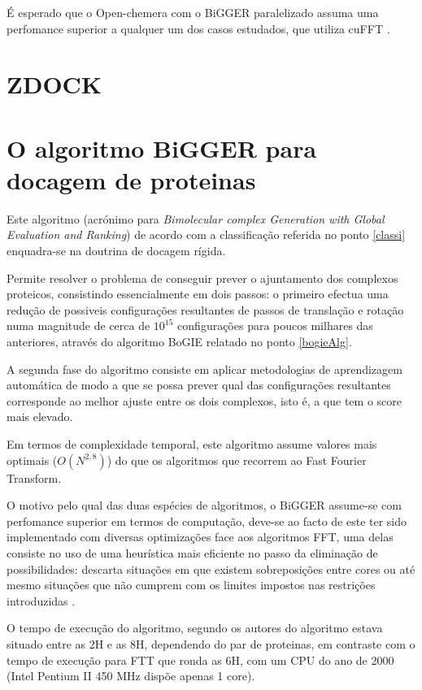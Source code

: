  É esperado que o Open-chemera com o BiGGER paralelizado assuma uma perfomance superior a qualquer um dos casos estudados, que utiliza cuFFT . 
 
\section{ZDOCK}

\section{O algoritmo BiGGER para docagem de proteinas}
\label{biggerAlg}
Este algoritmo (acrónimo para \textit{Bimolecular complex Generation with Global Evaluation and Ranking}) \cite{teseProf} de acordo com a classificação referida no ponto \ref{classi} enquadra-se na doutrina de docagem rígida\cite{biggerPaper}.

Permite resolver o problema de conseguir prever o ajuntamento dos complexos proteicos, consistindo essencialmente em dois passos: o primeiro efectua uma redução de possiveis configurações resultantes de passos de translação e rotação numa magnitude de cerca de $10^{15}$ configurações para poucos milhares das anteriores, através do algoritmo BoGIE relatado no ponto \ref{bogieAlg}.

A segunda fase do algoritmo consiste em aplicar metodologias de aprendizagem automática de modo a que se possa prever qual das configurações resultantes corresponde ao melhor ajuste entre os dois complexos, isto é, a que tem o score mais elevado.
 
Em termos de complexidade temporal, este algoritmo assume valores mais optimais ($O(N^{2,8})$\cite{biggerPaper}) do que os algoritmos que recorrem ao Fast Fourier Transform. 

O motivo pelo qual das duas espécies de algoritmos, o BiGGER assume-se com perfomance superior em termos de computação, deve-se ao facto de este ter sido implementado com diversas optimizações face aos algoritmos FFT, uma delas consiste no uso de uma heurística mais eficiente no passo da eliminação de possibilidades: descarta situações em que existem sobreposições entre cores ou até mesmo situações que não cumprem com os limites impostos nas restrições introduzidas \cite{biggerPaper}. 

O tempo de execução do algoritmo, segundo os autores do algoritmo estava situado entre as 2H e as 8H, dependendo do par de proteinas, em contraste com o tempo de execução para FTT que ronda as 6H, com um CPU do ano de 2000 (Intel Pentium II 450 MHz dispõe apenas 1 core)\cite{biggerPaper}. 

